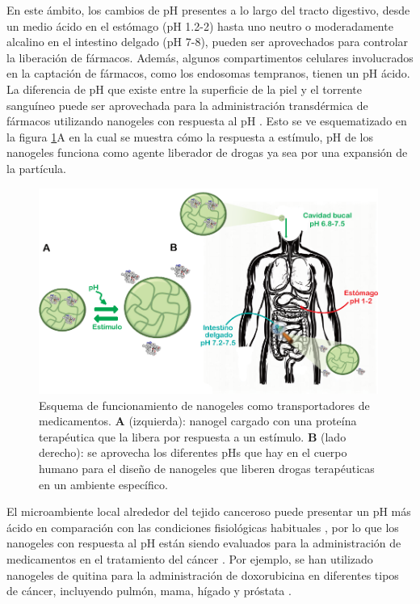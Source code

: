 En este \'ambito, los cambios de pH presentes a lo largo del tracto digestivo, desde un medio \'acido en el est\'omago (pH 1.2-2) hasta uno neutro o moderadamente alcalino en el intestino delgado (pH 7-8), pueden ser aprovechados para controlar la liberaci\'on de f\'armacos.
Adem\'as, algunos compartimentos celulares involucrados en la captaci\'on de f\'armacos, como los endosomas tempranos, tienen un pH \'acido. La diferencia de pH que existe entre la superficie de la piel y el torrente sangu\'ineo puede ser aprovechada para la administraci\'on transd\'ermica de f\'armacos utilizando nanogeles con respuesta al pH \cite{qindeel2019development}.
Esto se ve esquematizado en la figura \ref{fig:intro:sistema}A en la cual se muestra c\'omo la respuesta a est\'imulo, pH  de los nanogeles funciona como agente liberador de drogas ya sea por una expansi\'on de la part\'icula.


\begin{figure}
	\centering
	\includegraphics[width=0.99\textwidth]{Figures/modelos/sistema.pdf}
	\caption{Esquema de funcionamiento de nanogeles como transportadores de medicamentos. 
		\textbf{A} (izquierda): nanogel cargado con una prote\'ina terap\'eutica que la libera por respuesta a un est\'imulo. \textbf{B} (lado derecho): se aprovecha los diferentes pHs que hay en el cuerpo humano para el dise\~no de nanogeles que liberen drogas terap\'euticas en un ambiente espec\'ifico. }
	\label{fig:intro:sistema}
\end{figure}

El microambiente local alrededor del tejido canceroso puede presentar un pH m\'as \'acido en comparaci\'on con las condiciones fisiol\'ogicas habituales \cite{lawson1963breast,tannock1989acid,gerweck2006tumor}, por lo que los nanogeles con respuesta al pH est\'an siendo evaluados para la administraci\'on de medicamentos en el tratamiento del c\'ancer \cite{peng2013controlled,kanamala2016mechanisms}. Por ejemplo, se han utilizado nanogeles de quitina para la administraci\'on de doxorubicina en diferentes tipos de c\'ancer, incluyendo pulm\'on, mama, h\'igado y pr\'ostata \cite{jayakumar2012doxorubicin}.

